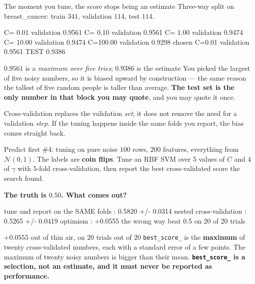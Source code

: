 \documentclass[aspectratio=169]{beamer}
\begin{document}
\begin{frame}[fragile,shrink=8]{The moment you tune, the score stops being an estimate}
Three-way split on breast\_cancer: train $341$, validation $114$, test $114$.
\begin{outblk}
      C=  0.01  validation 0.9561
      C=  0.10  validation 0.9561
      C=  1.00  validation 0.9474
      C= 10.00  validation 0.9474
      C=100.00  validation 0.9298
   chosen C=0.01   validation 0.9561   TEST 0.9386
\end{outblk}
\begin{alertblock}{$0.9561$ is a \emph{maximum over five tries}; $0.9386$ is
  the estimate}
  \footnotesize You picked the largest of five noisy numbers, so it is biased
  upward by construction --- the same reason the tallest of five random
  people is taller than average. \textbf{The test set is the only number in
  that block you may quote}, and you may quote it once.
\end{alertblock}
\begin{center}\small
  Cross-validation replaces the validation \emph{set}; it does not remove the
  need for a validation \emph{step}. If the tuning happens inside the same
  folds you report, the bias comes straight back.
\end{center}
\end{frame}

\begin{frame}[fragile,shrink=8]{Predict first \#4: tuning on pure noise}
$100$ rows, $200$ features, everything from $\mathcal{N}(0,1)$. The labels are
\textbf{coin flips}. Tune an RBF SVM over $5$ values of $C$ and $4$ of
$\gamma$ with $5$-fold cross-validation, then report the best cross-validated
score the search found.

\begin{center}
  \textbf{The truth is $0.50$. What comes out?}
\end{center}
\begin{outblk}
   tune and report on the SAME folds : 0.5820  +/- 0.0314
   nested cross-validation           : 0.5265  +/- 0.0419
   optimism                          : +0.0555
   the wrong way beat 0.5 on 20 of 20 trials
\end{outblk}
\begin{alertblock}{$+0.0555$ out of thin air, on $20$ trials out of $20$}
  \footnotesize \texttt{best\_score\_} is the \textbf{maximum} of twenty
  cross-validated numbers, each with a standard error of a few points. The
  maximum of twenty noisy numbers is bigger than their mean.
  \textbf{\texttt{best\_score\_} is a selection, not an estimate, and it must
  never be reported as performance.}
\end{alertblock}
\end{frame}
\end{document}
